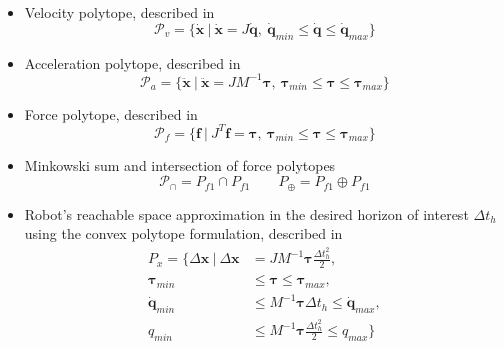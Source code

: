 \begin{itemize}
\itemindent=-13pt
\item Velocity polytope, described in 
\begin{equation}\label{eq:pv_r}
\mathcal{P}_{v} = \{\dot{\bm{x}} ~| ~\dot{\bm{x}} = J\dot{\bm{q}},~ \dot{\bm{q}}_{min}\leq\dot{\bm{q}}\leq\dot{\bm{q}}_{max} \}
\end{equation}

\item Acceleration polytope, described in 
\begin{equation}\label{eq:pa_r}
\mathcal{P}_{a} = \{\ddot{\bm{x}} ~| ~\ddot{\bm{x}} = JM^{-1}\bm{\tau},~ \bm{\tau}_{min}\leq\bm{\tau}\leq\bm{\tau}_{max} \}
\end{equation}

\item Force polytope, described in 
\begin{equation}\label{eq:pf_r}
\mathcal{P}_{f} = \{\bm{f} ~| ~J^{T}\bm{f} = \bm{\tau},~ \bm{\tau}_{min}\leq\bm{\tau}\leq\bm{\tau}_{max} \}
\end{equation}

\item Minkowski sum and intersection of force polytopes
\begin{equation}\label{eq:psi_r}
\mathcal{P}_{\cap} = {P}_{f1} \cap {P}_{f1} \qquad P_{\oplus} = {P}_{f1} \oplus {P}_{f1} 
\end{equation}

\item Robot's reachable space approximation in the desired horizon of interest $\Delta t_{h}$ using the 
convex polytope formulation, described in 
\begin{equation}\label{eq:prs_r}
\begin{split}
P_x = \{\Delta \bm{x}~ |~ \Delta \bm{x} &= JM^{-1}\bm{\tau} \frac{\Delta t_{h}^2}{2},\\
  {\bm{\tau}}_{min} &\leq \bm{\tau} \leq {\bm{\tau}}_{max},\\
   \dot{\bm{q}}_{min} &\leq M^{-1}\bm{\tau} \Delta t_{h}  \leq \dot{\bm{q}}_{max}, \\
  {q}_{min} &\leq M^{-1}\bm{\tau} \frac{\Delta t_{h}^2}{2}  \leq {q}_{max} \}\\
  \end{split}
\end{equation}
\end{itemize}

